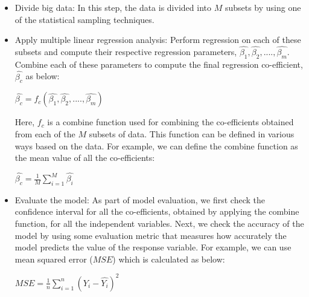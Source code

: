 \documentclass[sigconf]{acmart}
\begin{document}
\begin{itemize}
	\item Divide big data: In this step, the data is divided into $M$ subsets by using one of the statistical sampling techniques.
	\item Apply multiple linear regression analysis: Perform regression on each of these subsets and compute their respective regression parameters, $\hat{\beta_1}, \hat{\beta_2}, ...., \hat{\beta_m}$. Combine each of these parameters to compute the final regression co-efficient, $\hat{\beta_c}$ as below:
	\begin{center}$\hat{\beta_c} = f_c(\hat{\beta_1}, \hat{\beta_2}, ...., \hat{\beta_m})$\end{center}
	Here, $f_c$ is a combine function used for combining the co-efficients obtained from each of the $M$ subsets of data. This function can be defined in various ways based on the data. For example, we can define the combine function as the mean value of all the co-efficients: 
	\begin{center} $\hat{\beta_c} = \frac{1}{M}\sum_{i=1}^M \hat{\beta_i}$ \end{center}
	\item Evaluate the model: As part of model evaluation, we first check the confidence interval for all the co-efficients, obtained by applying the combine function, for all the independent variables. Next, we check the accuracy of the model by using some evaluation metric that measures how accurately the model predicts the value of the response variable. For example, we can use mean squared error ($MSE$) which is calculated as below:
	\begin{center} $MSE = \frac{1}{n}\sum_{i=1}^n (Y_i - \hat{Y_i})^2$ \end{center}
\end{itemize} 
\end{document}
